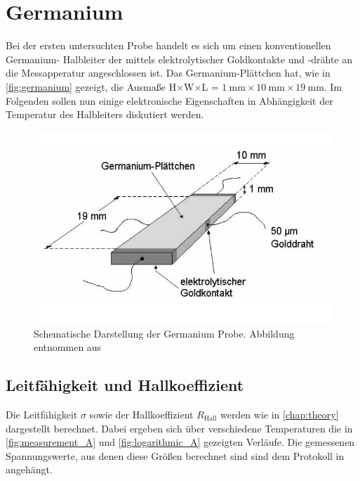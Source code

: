 
\section{Germanium}
\label{sec:germanium}

Bei der ersten untersuchten Probe handelt es sich um einen konventionellen Germanium-
Halbleiter der mittels elektrolytischer Goldkontakte und -drähte an die Messapperatur
angeschlossen ist. Das Germanium-Plättchen hat, wie in \autoref{fig:germanium} 
gezeigt, die Ausmaße H$\times$W$\times$L = $\SI{1}{\milli\meter}\times\SI{10}{\milli
\meter}\times\SI{19}{\milli\meter}$. Im Folgenden sollen nun einige elektronische
Eigenschaften in Abhängigkeit der Temperatur des Halbleiters diskutiert werden.

\begin{figure}
	\centering
	\includegraphics[width=1.0\textwidth]{./fig/germanium.png}
	\caption{Schematische Darstellung der Germanium Probe. Abbildung entnommen 
aus \cite{Manual}}
	\label{fig:germanium}
\end{figure}

\subsection{Leitfähigkeit und Hallkoeffizient}
\label{ssec:leitfähigkeit}

Die Leitfähigkeit $\sigma$ sowie der Hallkoeffizient $R_\text{Hall}$ werden wie in 
\autoref{chap:theory} dargestellt berechnet. Dabei ergeben sich über verschiedene
Temperaturen die in \autoref{fig:measurement_A} und \autoref{fig:logarithmic_A} 
gezeigten Verläufe. Die gemessenen Spannungswerte, aus denen diese Größen berechnet 
sind sind dem Protokoll in    angehängt.

